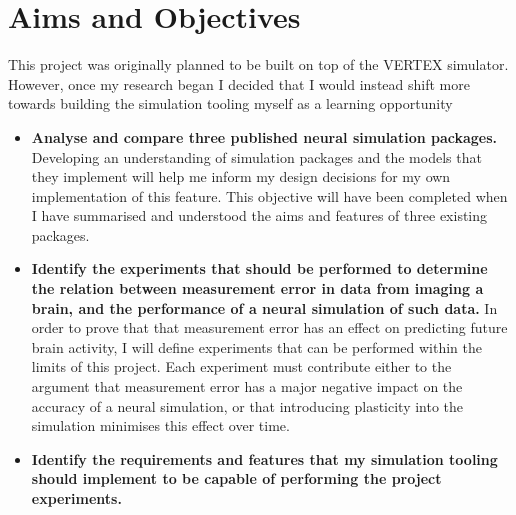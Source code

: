 \section{Aims and Objectives}

This project was originally planned to be built on top of the VERTEX simulator.
However, once my research began I decided that I would instead shift more
towards building the simulation tooling myself as a learning opportunity 

\begin{itemize}
    \item \textbf{Analyse and compare three published neural simulation packages.}
          Developing an understanding of simulation packages and the models that
          they implement will help me inform my design decisions for my own
          implementation of this feature. This objective will have been
          completed when I have summarised and understood the aims and features
          of three existing packages.
    \item \textbf{Identify the experiments that should be performed to determine
    the relation between measurement error in data from imaging a brain, and the
    performance of a neural simulation of such data.} In order to prove that
    that measurement error has an effect on predicting future brain activity, I
    will define experiments that can be performed within the limits of this
    project. Each experiment must contribute either to the argument that
    measurement error has a major negative impact on the accuracy of a neural
    simulation, or that introducing plasticity into the simulation minimises
    this effect over time.
    \item \textbf{Identify the requirements and features that my simulation tooling should implement to be capable of performing the project experiments.}
    

\end{itemize}
